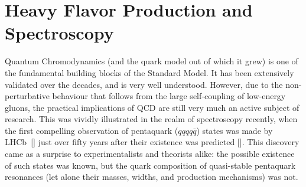 \section{Heavy Flavor Production and Spectroscopy }

%
%
%


Quantum Chromodynamics (and the quark model out of which it grew)
is one of the fundamental building blocks of the Standard Model.
It has been extensively validated over the decades, and is
very well understood. However, due to the non-perturbative behaviour
that follows from the large self-coupling of low-energy gluons,
the practical implications of QCD are still
very much an active subject of research. This was vividly illustrated
in the realm of spectroscopy recently, when the first compelling
observation of pentaquark ($qqqq\bar{q}$) states was made by LHCb~[\cite{Aaij:2015tga}]
just over fifty years after their existence was predicted [\cite{GellMann:1964nj}].
This discovery came as a surprise to experimentalists and theorists alike:
the possible existence of such states was known, but the quark composition of
quasi-stable pentaquark resonances (let alone their masses, widths, and
production mechanisms) was not.

